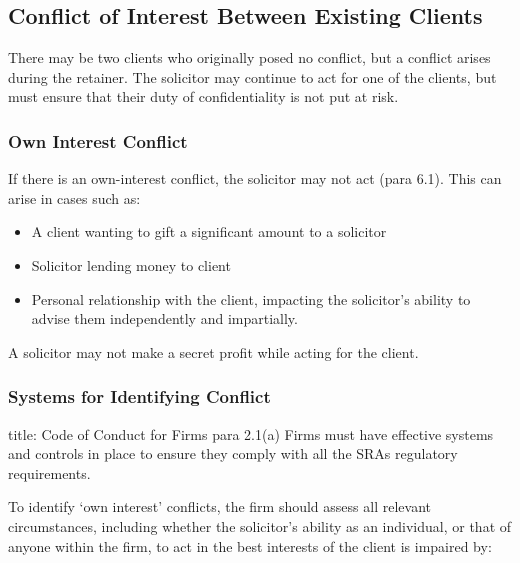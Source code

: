 \documentclass[
]{article}
\newenvironment{Shaded}{}{}
\newcommand{\NormalTok}[1]{#1}
\providecommand{\tightlist}{%
  \setlength{\itemsep}{0pt}\setlength{\parskip}{0pt}}
\begin{document}
\hypertarget{conflict-of-interest-between-existing-clients}{%
\subsection{Conflict of Interest Between Existing
Clients}\label{conflict-of-interest-between-existing-clients}}

There may be two clients who originally posed no conflict, but a
conflict arises during the retainer. The solicitor may continue to act
for one of the clients, but must ensure that their duty of
confidentiality is not put at risk.

\hypertarget{own-interest-conflict}{%
\subsubsection{Own Interest Conflict}\label{own-interest-conflict}}

If there is an own-interest conflict, the solicitor may not act (para
6.1). This can arise in cases such as:

\begin{itemize}
\tightlist
\item
  A client wanting to gift a significant amount to a solicitor
\item
  Solicitor lending money to client
\item
  Personal relationship with the client, impacting the solicitor's
  ability to advise them independently and impartially.
\end{itemize}

A solicitor may not make a secret profit while acting for the client.

\hypertarget{systems-for-identifying-conflict}{%
\subsubsection{Systems for Identifying
Conflict}\label{systems-for-identifying-conflict}}

\begin{Shaded}
\begin{Highlighting}[]
\NormalTok{title: Code of Conduct for Firms para 2.1(a)}
\NormalTok{Firms must have effective systems and controls in place to ensure they comply with all the SRA\textquotesingle{}s regulatory requirements. }
\end{Highlighting}
\end{Shaded}

To identify `own interest' conflicts, the firm should assess all
relevant circumstances, including whether the solicitor's ability as an
individual, or that of anyone within the firm, to act in the best
interests of the client is impaired by:
\end{document}
